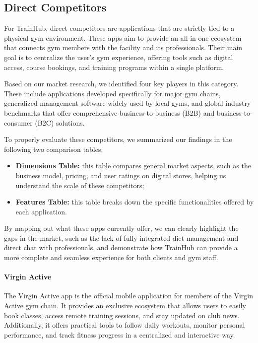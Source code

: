 \subsection{Direct Competitors}\label{subsect:DirectCompetitors}
For TrainHub, direct competitors are applications that are strictly tied to a physical gym environment. These apps aim to provide an all-in-one ecosystem that connects gym members with the facility and its professionals. Their main goal is to centralize the user's gym experience, offering tools such as digital access, course bookings, and training programs within a single platform.

Based on our market research, we identified four key players in this category. These include applications developed specifically for major gym chains, generalized management software widely used by local gyms, and global industry benchmarks that offer comprehensive business-to-business (B2B) and business-to-consumer (B2C) solutions.

To properly evaluate these competitors, we summarized our findings in the following two comparison tables:
\begin{itemize}
    \item \textbf{Dimensions Table:} this table compares general market aspects, such as the business model, pricing, and user ratings on digital stores, helping us understand the scale of these competitors;
    \item \textbf{Features Table:} this table breaks down the specific functionalities offered by each application.
\end{itemize}

By mapping out what these apps currently offer, we can clearly highlight the gaps in the market, such as the lack of fully integrated diet management and direct chat with professionals, and demonstrate how TrainHub can provide a more complete and seamless experience for both clients and gym staff.

\paragraph{Virgin Active}The Virgin Active app is the official mobile application for members of the Virgin Active gym chain. It provides an exclusive ecosystem that allows users to easily book classes, access remote training sessions, and stay updated on club news. Additionally, it offers practical tools to follow daily workouts, monitor personal performance, and track fitness progress in a centralized and interactive way.

